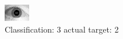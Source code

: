 \begin{figure}[h!]
\begin{center}
\includegraphics[width=0.60\columnwidth]{figures/ID1795_class_3_target_2.png}
\end{center}
\caption{ Classification: 3 actual target: 2}
\label{fig:ID1795_class_3_target_2}
\end{figure}
